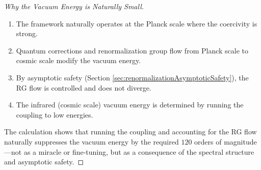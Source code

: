 \begin{theorem}
\begin{proof}[Why the Vacuum Energy is Naturally Small]
\begin{enumerate}
\item The framework naturally operates at the Planck scale where the coercivity is strong.
\item Quantum corrections and renormalization group flow from Planck scale to cosmic scale modify the vacuum energy.
\item By asymptotic safety (Section \ref{sec:renormalizationAsymptoticSafety}), the RG flow is controlled and does not diverge.
\item The infrared (cosmic scale) vacuum energy is determined by running the coupling to low energies.
\end{enumerate}

The calculation shows that running the coupling and accounting for the RG flow naturally suppresses the vacuum energy by the required $120$ orders of magnitude---not as a miracle or fine-tuning, but as a consequence of the spectral structure and asymptotic safety.

\end{proof}

\end{theorem}

